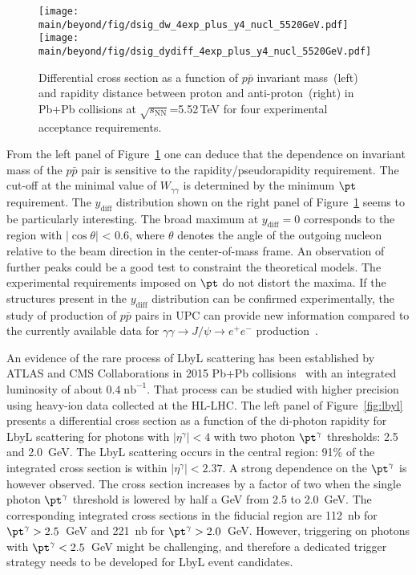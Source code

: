 \documentclass[../report.tex]{subfiles}
\providecommand{\main}{..}
\begin{document}
\begin{figure}[!h]
        \texttt{[image: \\main/beyond/fig/dsig\_dw\_4exp\_plus\_y4\_nucl\_5520GeV.pdf]}
        \texttt{[image: \\main/beyond/fig/dsig\_dydiff\_4exp\_plus\_y4\_nucl\_5520GeV.pdf]}
        \caption{
                Differential cross section as a function of $p\bar{p}$
                invariant mass~(left) and rapidity
                distance between proton and anti-proton~(right)
                in Pb+Pb collisions at $\sqrt{s_{\mathrm{NN}}}$=5.52\,TeV
                for four experimental acceptance requirements.
        }
        \label{fig:ppbar}
\end{figure}


From the left panel of Figure~\ref{fig:ppbar} one can deduce that the dependence on invariant mass of the $p\bar{p}$ pair is sensitive to the rapidity/pseudorapidity requirement. The cut-off at the minimal value of $W_{\gamma\gamma}$ is determined by the minimum $\pt$ requirement.
The $y_{\mathrm{diff}}$ distribution shown on the right panel of Figure~\ref{fig:ppbar} seems to be particularly interesting. 
The broad maximum at $y_{\mathrm{diff}}=0$ corresponds to the region with $|\cos \theta|$ < 0.6, where $\theta$ denotes the angle of the outgoing nucleon relative to the beam direction in the center-of-mass frame. An observation of further peaks could be a good test to constraint the theoretical models. The experimental requirements
imposed on $\pt$ do not distort the maxima. If the structures present in the $y_{\mathrm{diff}}$ distribution can be confirmed experimentally, the study of production of $p\bar{p}$ pairs
in UPC can provide new information compared to the currently available data for $\gamma\gamma\rightarrow J/\psi \rightarrow e^+e^-$ production~\cite{Kryshen:2017jfz,Abbas:2013oua}.


An evidence of the rare process of LbyL scattering has been established by ATLAS and CMS Collaborations in 2015 Pb+Pb collisions~\cite{Aaboud:2017bwk,Sirunyan:2018fhl} with an integrated luminosity of about $0.4\;\mathrm{nb}^{-1}$. That process can be studied with higher precision using heavy-ion data collected at the HL-LHC. The left panel of Figure~\ref{fig:lbyl} presents a differential cross section as a function of the di-photon rapidity for LbyL scattering for photons with $|\eta^\gamma|<4$ with two photon $\pt^\gamma$ thresholds: 2.5 and 2.0~GeV. The LbyL scattering occurs in the central region: 91\% of the integrated cross section is within $|\eta^\gamma|<2.37$. A strong dependence on the $\pt^\gamma$ is however observed. The cross section increases by a factor of two when the single photon $\pt^\gamma$ threshold is lowered by half a GeV from 2.5 to 2.0~GeV. The corresponding integrated cross sections in the fiducial region are 112~nb for $\pt^\gamma>2.5$~GeV and 221~nb for $\pt^\gamma>2.0$~GeV. However, triggering on photons with $\pt^\gamma<2.5$~GeV might be challenging, and therefore a dedicated trigger strategy needs to be developed for LbyL event candidates.
\end{document}
